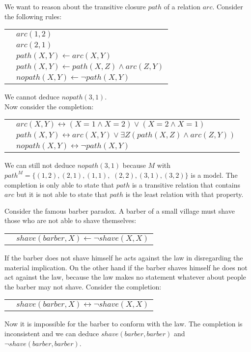 \begin{Bsp} \label{bsptrans}
We want to reason about the transitive closure $path$ of a relation
$arc$. Consider the following rules:

\begin{tabular}{ll}
\quad & $arc(1,2)$ \\
\quad & $arc(2,1)$ \\
\quad & $path(X,Y) \leftarrow arc(X,Y)$ \\
\quad & $path(X,Y) \leftarrow path(X,Z) \wedge arc(Z,Y)$ \\
\quad & $nopath(X,Y) \leftarrow \neg path(X,Y)$
\end{tabular}

We cannot deduce $nopath(3,1)$. \\
Now consider the completion:

\begin{tabular}{ll}
\quad & $arc(X,Y) \leftrightarrow (X=1 \wedge X=2) \vee (X=2 \wedge X=1)$ \\
\quad & $path(X,Y) \leftrightarrow arc(X,Y) \vee \exists Z(path(X,Z) \wedge arc(Z,Y))$ \\
\quad & $nopath(X,Y) \leftrightarrow \neg path(X,Y)$
\end{tabular}

We can still not deduce $nopath(3,1)$ because $M$ with $path^M = \{ (1,2), (2,1), (1,1),$ $(2,2), 
(3,1), (3,2) \}$ is a model. The completion is only able to state that $path$ is a transitive 
relation that contains $arc$ but it is not able to state that $path$ is the least relation with 
that property.
\end{Bsp}

\begin{Bsp} \label{bspbarb}
Consider the famous barber paradox. A barber of a small village must shave those 
who are not able to shave themselves:

\begin{tabular}{ll}
\quad & $shave(barber,X) \leftarrow \neg shave(X,X)$
\end{tabular}

If the barber does not shave himself he acts against the law in disregarding the material 
implication. On the other hand if the barber shaves himself he does not act against the law, 
because the law makes no statement whatever about people the barber may not shave. Consider 
the completion:

\begin{tabular}{ll}
\quad & $shave(barber,X) \leftrightarrow \neg shave(X,X)$
\end{tabular}

Now it is impossible for the barber to conform with the law. The completion is inconsistent and
we can deduce $shave(barber,barber)$ and $\neg shave(barber,barber)$. 
\end{Bsp}

